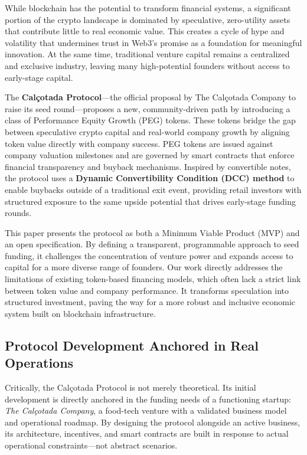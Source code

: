 \documentclass[conference]{IEEEtran}
\begin{document}
While blockchain has the potential to transform financial systems, a significant portion of the crypto landscape is dominated by speculative, zero-utility assets that contribute little to real economic value. This creates a cycle of hype and volatility that undermines trust in Web3's promise as a foundation for meaningful innovation. At the same time, traditional venture capital remains a centralized and exclusive industry, leaving many high-potential founders without access to early-stage capital.

The \textbf{Calçotada Protocol}—the official proposal by The Calçotada Company to raise its seed round—proposes a new, community-driven path by introducing a class of Performance Equity Growth (PEG) tokens. These tokens bridge the gap between speculative crypto capital and real-world company growth by aligning token value directly with company success. PEG tokens are issued against company valuation milestones and are governed by smart contracts that enforce financial transparency and buyback mechanisms. Inspired by convertible notes, the protocol uses a \textbf{Dynamic Convertibility Condition (DCC) method} to enable buybacks outside of a traditional exit event, providing retail investors with structured exposure to the same upside potential that drives early-stage funding rounds.

This paper presents the protocol as both a Minimum Viable Product (MVP) and an open specification. By defining a transparent, programmable approach to seed funding, it challenges the concentration of venture power and expands access to capital for a more diverse range of founders. Our work directly addresses the limitations of existing token-based financing models, which often lack a strict link between token value and company performance. It transforms speculation into structured investment, paving the way for a more robust and inclusive economic system built on blockchain infrastructure.

\subsection{Protocol Development Anchored in Real Operations}

Critically, the Calçotada Protocol is not merely theoretical. Its initial development is directly anchored in the funding needs of a functioning startup: \textit{The Calçotada Company}, a food-tech venture with a validated business model and operational roadmap. By designing the protocol alongside an active business, its architecture, incentives, and smart contracts are built in response to actual operational constraints—not abstract scenarios.
\end{document}
